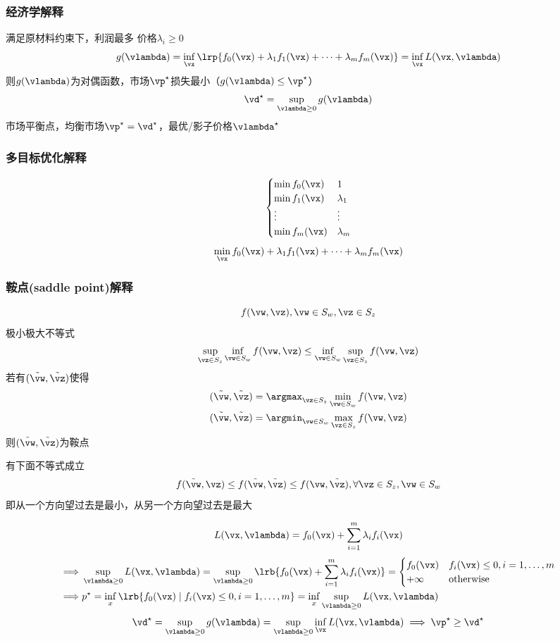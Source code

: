 \subsubsection{经济学解释}
满足原材料约束下，利润最多
价格$\lambda_i\geq 0$
\[g(\vlambda)=\inf_\vx \lrp{f_0(\vx)+\lambda_1 f_1(\vx)+\cdots+\lambda_m f_m(\vx)}=\inf_\vx L(\vx,\vlambda)\]
则$g(\vlambda)$为对偶函数，市场$\vp^\star$损失最小（$g(\vlambda)\leq \vp^\star$）
\[\vd^\star=\sup_{\vlambda\geq 0}g(\vlambda)\]
市场平衡点，均衡市场$\vp^\star=\vd^\star$，最优/影子价格$\vlambda^\star$

\subsubsection{多目标优化解释}
\[\begin{cases}
    \min f_0(\vx) & 1\\
    \min f_1(\vx) & \lambda_1\\
    \vdots & \vdots\\
    \min f_m(\vx) & \lambda_m
\end{cases}\]
\[\min_\vx f_0(\vx)+\lambda_1 f_1(\vx)+\cdots+\lambda_m f_m(\vx)\]

\subsubsection{鞍点(saddle point)解释}
\[f(\vw,\vz),\vw\in S_w,\vz\in S_z\]
极小极大不等式
\[\sup_{\vz\in S_z}\inf_{\vw\in S_w} f(\vw,\vz)\leq \inf_{\vw\in S_w}\sup_{\vz\in S_z}f(\vw,\vz)\]
若有$(\tilde{\vw},\tilde{\vz})$使得
\[\begin{aligned}
    (\tilde{\vw},\tilde{\vz})&=\argmax_{\vz\in S_z}\min_{\vw\in S_w} f(\vw,\vz)\\
    (\tilde{\vw},\tilde{\vz})&=\argmin_{\vw\in S_w}\max_{\vz\in S_z} f(\vw,\vz)
\end{aligned}\]
则$(\tilde{\vw},\tilde{\vz})$为鞍点

有下面不等式成立
\[f(\tilde{\vw},\vz)\leq f(\tilde{\vw},\tilde{\vz})\leq f(\vw,\tilde{\vz}),\forall \vz\in S_z,\vw\in S_w\]
即从一个方向望过去是最小，从另一个方向望过去是最大

\[L(\vx,\vlambda)=f_0(\vx)+\sum_{i=1}^m\lambda_i f_i(\vx)\]
\[\begin{aligned}
    \implies& \sup_{\vlambda\geq 0}L(\vx,\vlambda)=\sup_{\vlambda\geq 0}\lrb{f_0(\vx)+\sum_{i=1}^m\lambda_if_i(\vx)}=
    \begin{cases}f_0(\vx)&f_i(\vx)\leq 0,i=1,\ldots,m\\+\infty&\text{otherwise}\end{cases}\\
    \implies& p^\star =\inf_x\lrb{f_0(\vx)\mid f_i(\vx)\leq 0,i=1,\ldots,m}=\inf_x\sup_{\vlambda\geq 0}L(\vx,\vlambda)
\end{aligned}\]
\[\vd^\star=\sup_{\vlambda\geq 0}g(\vlambda)=\sup_{\vlambda\geq 0}\inf_\vx L(\vx,\vlambda)\implies \vp^\star\geq \vd^\star\]

